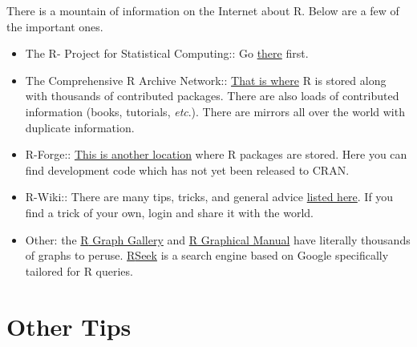 \documentclass[captions=tableheading]{scrbook}
\begin{document}
There is a mountain of information on the Internet about \textsf{R}. Below are a few of the important ones. 
\begin{itemize}
\item The \textsf{R}- Project for Statistical Computing:: Go \href{http://www.r-project.org/}{there} first.
\item The Comprehensive \textsf{R} Archive Network:: \href{http://cran.r-project.org/}{That is where} \textsf{R} is stored along with thousands of contributed packages. There are also loads of contributed information (books, tutorials, \emph{etc}.). There are mirrors all over the world with duplicate information.
\item \textsf{R}-Forge:: \href{http://r-forge.r-project.org/}{This is another location} where \textsf{R} packages are stored. Here you can find development code which has not yet been released to \textsf{CRAN}.
\item \textsf{R}-Wiki:: There are many tips, tricks, and general advice \href{http://wiki.r-project.org/rwiki/doku.php}{listed here}. If you find a trick of your own, login and share it with the world.
\item Other: the \href{http://addictedtor.free.fr/graphiques/}{\textsf{R} Graph Gallery} and \href{http://bm2.genes.nig.ac.jp/RGM2/index.php}{\textsf{R} Graphical Manual} have literally thousands of graphs to peruse. \href{http://www.rseek.org}{\textsf{R}Seek} is a search engine based on Google specifically tailored for \textsf{R} queries.
\end{itemize}
\section{Other Tips}
\label{sec-2-6}
\end{document}
